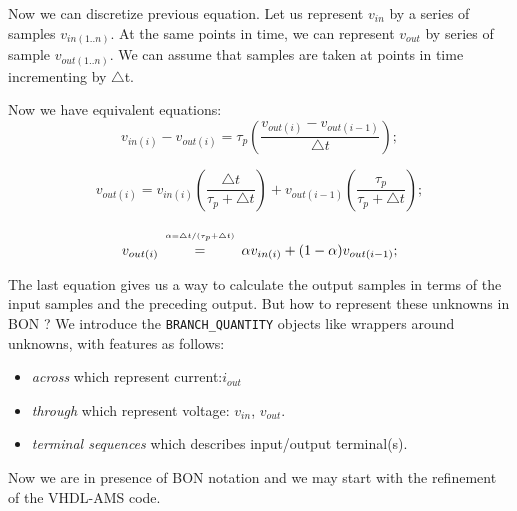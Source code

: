\documentclass{article}
\def\lstinlinen{\lstinline[language=Bon,basicstyle=\normalsize\upshape]}
\begin{document}
Now we can discretize previous equation. Let us represent $v_{in}$ by
a series of samples $v_{in(1..n)}$. At the same points in time, we can
represent $v_{out}$ by series of sample $v_{out(1..n)}$. We can assume
that samples are taken at points in time incrementing by
$\triangle$t. 

Now we have equivalent equations:
\begin{equation}
v_{in(i)}- v_{out(i)}=\tau_p(\frac{v_{out(i)}- v_{out(i-1)}} {\triangle t});                                                                                          \end{equation}

\begin{equation}
v_{out(i)}=v_{in(i)}(\frac{\triangle t}{\tau_p + \triangle t}) +
 v_{out(i-1)}(\frac{\tau_p}{\tau_p + \triangle t});                                                                                                                  
\end{equation}

\begin{equation}
v_{out(i)} 
 \begin{array}[b]{c}                                                                                                                                    
      {\scriptscriptstyle \alpha= \triangle t / (\tau_p + \triangle t)}  \\=                                                                              \end{array}
 \alpha v_{in(i)} + (1- \alpha) v_{out(i-1)};                                                                                                                  
\end{equation}

The last equation gives us a way to calculate the output samples in
terms of the input samples and the preceding output.  But how to
represent these unknowns in BON ?  We introduce the
\lstinlinen|BRANCH_QUANTITY| objects like wrappers around unknowns,
with features as follows:
\begin{itemize}
\item
\emph{across} which represent current:$i_{out}$ 
\item 
\emph{through} which represent voltage: $v_{in}$, $v_{out}$. 
\item 
\emph{terminal sequences} which describes input/output terminal(s). 
\end{itemize}
Now we are in presence of BON notation and we may start with the
refinement of the VHDL-AMS code.
\end{document}
